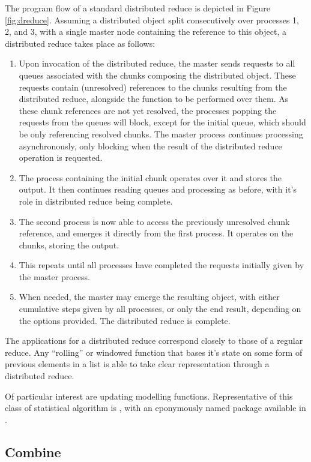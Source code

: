 The program flow of a standard distributed reduce is depicted in Figure \ref{fig:dreduce}.
Assuming a distributed object split consecutively over processes 1, 2, and 3, with a single master node containing the reference to this object, a distributed reduce takes place as follows:
\begin{enumerate}
	\item Upon invocation of the distributed reduce, the master sends requests to all queues associated with the chunks composing the distributed object. These requests contain (unresolved) references to the chunks resulting from the distributed reduce, alongside the function to be performed over them. As these chunk references are not yet resolved, the processes popping the requests from the queues will block, except for the initial queue, which should be only referencing resolved chunks. The master process continues processing asynchronously, only blocking when the result of the distributed reduce operation is requested.
	\item The process containing the initial chunk operates over it and stores the output. It then continues reading queues and processing as before, with it's role in distributed reduce being complete.
	\item The second process is now able to access the previously unresolved chunk reference, and emerges it directly from the first process. It operates on the chunks, storing the output.
	\item This repeats until all processes have completed the requests initially given by the master process.
	\item When needed, the master may emerge the resulting object, with either cumulative steps given by all processes, or only the end result, depending on the options provided. The distributed reduce is complete.
\end{enumerate}

The applications for a distributed reduce correspond closely to those of a regular reduce.
Any ``rolling'' or windowed function that bases it's state on some form of previous elements in a list is able to take clear representation through a distributed reduce.

Of particular interest are updating modelling functions.
Representative of this class of statistical algorithm is , with an eponymously named package available in \R.

\subsection{Combine}\label{sec:combine}

